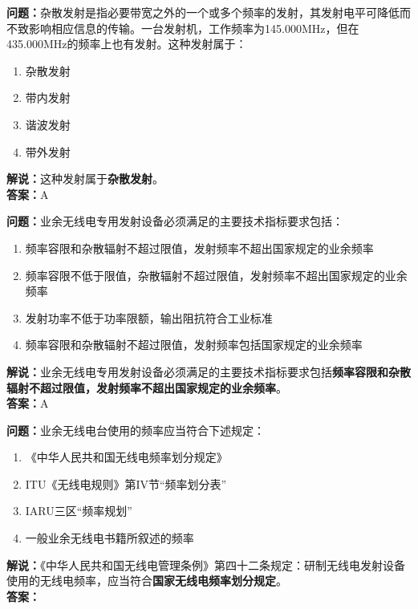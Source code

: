 \bigskip


\noindent\textbf{问题：}杂散发射是指必要带宽之外的一个或多个频率的发射，其发射电平可降低而不致影响相应信息的传输。一台发射机，工作频率为145.000MHz，但在435.000MHz的频率上也有发射。这种发射属于：
\begin{enumerate}[label=\Alph*), leftmargin=3em]
\item 杂散发射
\item 带内发射
\item 谐波发射
\item 带外发射
\end{enumerate}
\noindent\textbf{解说：}这种发射属于\textbf{杂散发射}。\\\noindent\textbf{答案：}A




\bigskip


\noindent\textbf{问题：}业余无线电专用发射设备必须满足的主要技术指标要求包括：
\begin{enumerate}[label=\Alph*), leftmargin=3em]
\item 频率容限和杂散辐射不超过限值，发射频率不超出国家规定的业余频率
\item 频率容限不低于限值，杂散辐射不超过限值，发射频率不超出国家规定的业余频率
\item 发射功率不低于功率限额，输出阻抗符合工业标准
\item 频率容限和杂散辐射不超过限值，发射频率包括国家规定的业余频率
\end{enumerate}
\noindent\textbf{解说：}业余无线电专用发射设备必须满足的主要技术指标要求包括\textbf{频率容限和杂散辐射不超过限值，发射频率不超出国家规定的业余频率}。\\\noindent\textbf{答案：}A


\bigskip


\noindent\textbf{问题：}业余无线电台使用的频率应当符合下述规定：
\begin{enumerate}[label=\Alph*), leftmargin=3em]
\item 《中华人民共和国无线电频率划分规定》
\item ITU《无线电规则》第IV节“频率划分表”
\item IARU三区“频率规划”
\item 一般业余无线电书籍所叙述的频率
\end{enumerate}
\noindent\textbf{解说：}《中华人民共和国无线电管理条例》第四十二条规定：研制无线电发射设备使用的无线电频率，应当符合\textbf{国家无线电频率划分规定}。\\\noindent\textbf{答案：}


